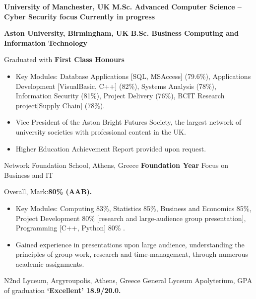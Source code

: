 {\textbf{University of Manchester, UK}}
{\textbf{M.Sc. Advanced Computer Science -- Cyber Security focus}}
{\textbf{Currently in progress} }

{\textbf{Aston University, Birmingham, UK}}
{\textbf{B.Sc. Business Computing and Information Technology}}
{
    Graduated with \textbf{First Class Honours }
    \begin{itemize}
        \item Key Modules: Database Applications [SQL, MSAccess] (79.6\%), Applications Development [VisualBasic, C++] (82\%), Systems Analysis (78\%), Information Security (81\%), Project Delivery (76\%), BCIT Research project[Supply Chain]  (78\%).
        \item Vice President of the Aston Bright Futures Society, the largest network of university societies with professional content in the UK.
        \item Higher Education Achievement Report provided upon request.
    \end{itemize}
}

{Network Foundation School, Athens, Greece}
{\textbf{Foundation Year} Focus on Business and IT}
{
    Overall, Mark:\textbf{80\% (AAB).}
    \begin{itemize}
        \item Key Modules: Computing 83\%, Statistics 85\%, Business and Economics 85\%, Project Development 80\% [research and large-audience group presentation], Programming [C++, Python] 80\% .
        \item Gained experience in presentations upon large audience, understanding the principles of group work, research and time-management, through numerous academic assignments.
    \end{itemize}
}

{}
{N2nd Lyceum, Argyroupolis, Athens, Greece}
{General Lyceum Apolyterium, GPA of graduation \textbf{‘Excellent’ 18.9/20.0.}}
